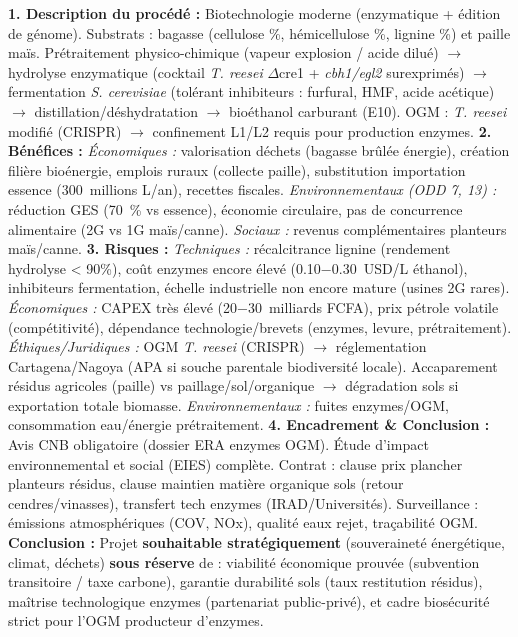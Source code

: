 \documentclass[11pt]{article}
\begin{document}
\begin{corrige}
\textbf{1. Description du procédé :} Biotechnologie moderne (enzymatique + édition de génome). Substrats : bagasse (cellulose \%, hémicellulose \%, lignine \%) et paille maïs. Prétraitement physico-chimique (vapeur explosion / acide dilué) $\rightarrow$ hydrolyse enzymatique (cocktail \emph{T. reesei} $\Delta$cre1 + \emph{cbh1/egl2} surexprimés) $\rightarrow$ fermentation \emph{S. cerevisiae} (tolérant inhibiteurs : furfural, HMF, acide acétique) $\rightarrow$ distillation/déshydratation $\rightarrow$ bioéthanol carburant (E10). OGM : \emph{T. reesei} modifié (CRISPR) $\rightarrow$ confinement L1/L2 requis pour production enzymes.
\textbf{2. Bénéfices :} \textit{Économiques :} valorisation déchets (bagasse brûlée \rightarrow énergie), création filière bioénergie, emplois ruraux (collecte paille), substitution importation essence (\approx \SI{300}{millions} L/an), recettes fiscales. \textit{Environnementaux (ODD 7, 13) :} réduction GES (\approx \SI{70}{\percent} vs essence), économie circulaire, pas de concurrence alimentaire (2G vs 1G maïs/canne). \textit{Sociaux :} revenus complémentaires planteurs maïs/canne.
\textbf{3. Risques :} \textit{Techniques :} récalcitrance lignine (rendement hydrolyse < 90\%), coût enzymes encore élevé (\approx \SI{0.10-0.30}{USD/L} éthanol), inhibiteurs fermentation, échelle industrielle non encore mature (usines 2G rares). \textit{Économiques :} CAPEX très élevé (\approx \SI{20-30}{milliards} FCFA), prix pétrole volatile (compétitivité), dépendance technologie/brevets (enzymes, levure, prétraitement). \textit{Éthiques/Juridiques :} OGM \emph{T. reesei} (CRISPR) $\rightarrow$ réglementation Cartagena/Nagoya (APA si souche parentale biodiversité locale). Accaparement résidus agricoles (paille) vs paillage/sol/organique $\rightarrow$ dégradation sols si exportation totale biomasse. \textit{Environnementaux :} fuites enzymes/OGM, consommation eau/énergie prétraitement.
\textbf{4. Encadrement \& Conclusion :} Avis CNB obligatoire (dossier ERA enzymes OGM). Étude d'impact environnemental et social (EIES) complète. Contrat : clause prix plancher planteurs résidus, clause maintien matière organique sols (retour cendres/vinasses), transfert tech enzymes (IRAD/Universités). Surveillance : émissions atmosphériques (COV, NOx), qualité eaux rejet, traçabilité OGM.
\textbf{Conclusion :} Projet \textbf{souhaitable stratégiquement} (souveraineté énergétique, climat, déchets) \textbf{sous réserve} de : viabilité économique prouvée (subvention transitoire / taxe carbone), garantie durabilité sols (taux restitution résidus), maîtrise technologique enzymes (partenariat public-privé), et cadre biosécurité strict pour l'OGM producteur d'enzymes.
\end{corrige}
\end{document}
